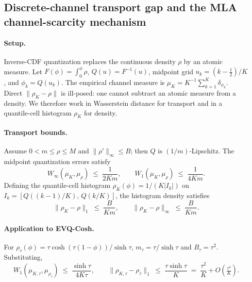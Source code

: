 \subsection{Discrete-channel transport gap and the MLA channel-scarcity mechanism}
\label{sec:discrete-continuous-gap}

\paragraph{Setup.} Inverse-CDF quantization replaces the continuous density $\rho$ by an atomic measure. Let $F(\phi){=}\int_0^\phi\rho$, $Q(u){=}F^{-1}(u)$, midpoint grid $u_k{=}(k{-}\tfrac{1}{2})/K$, and $\phi_k{=}Q(u_k)$. The empirical channel measure is $\mu_K{=}K^{-1}\sum_{k=1}^{K}\delta_{\phi_k}$. Direct $\|\rho_K-\rho\|$ is ill-posed: one cannot subtract an atomic measure from a density. We therefore work in Wasserstein distance for transport and in a quantile-cell histogram $\rho_K$ for density.

\paragraph{Transport bounds.} Assume $0<m\le\rho\le M$ and $\|\rho'\|_\infty\le B$; then $Q$ is $(1/m)$-Lipschitz. The midpoint quantization errors satisfy
\begin{equation}
W_\infty(\mu_K,\mu_\rho) \;\le\; \frac{1}{2Km}, \qquad W_1(\mu_K,\mu_\rho) \;\le\; \frac{1}{4Km}.
\label{eq:wasserstein-bound}
\end{equation}
Defining the quantile-cell histogram $\rho_K(\phi){=}1/(K|I_k|)$ on $I_k{=}[Q((k{-}1)/K),\,Q(k/K)]$, the histogram density satisfies
\begin{equation}
\|\rho_K-\rho\|_1 \;\le\; \frac{B}{Km}, \qquad \|\rho_K-\rho\|_\infty \;\le\; \frac{B}{Km}.
\label{eq:density-bound}
\end{equation}

\paragraph{Application to EVQ-Cosh.} For $\rho_\tau(\phi)=\tau\cosh(\tau(1{-}\phi))/\sinh\tau$, $m_\tau=\tau/\sinh\tau$ and $B_\tau=\tau^2$. Substituting,
\begin{equation}
W_1(\mu_{K,\tau},\mu_{\rho_\tau}) \;\le\; \frac{\sinh\tau}{4K\tau}, \qquad \|\rho_{K,\tau}-\rho_\tau\|_1 \;\le\; \frac{\tau\sinh\tau}{K} \;=\; \frac{\tau^2}{K}+O\!\left(\tfrac{\tau^4}{K}\right).
\label{eq:evq-discrete-bound}
\end{equation}

